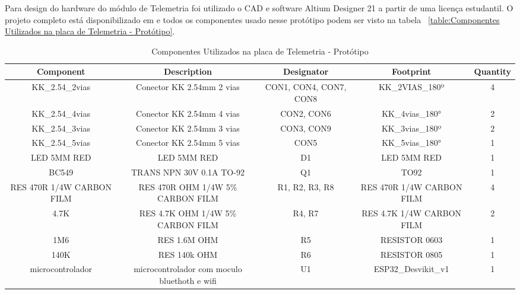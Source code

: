 \documentclass[../delivery_hospital_report.tex]{subfiles}
\begin{document}
Para design do hardware do módulo de Telemetria foi utilizado o CAD e software Altium Designer 21 \cite{altium21} a partir de uma licença estudantil. O projeto completo está disponibilizado em \cite{github_modulos} e todos os componentes usado nesse protótipo podem ser visto na tabela ~\ref{table:Componentes Utilizados na placa de Telemetria - Protótipo}.

\begin{table}[!h]
\caption{Componentes Utilizados na placa de Telemetria - Protótipo}
\centering
\begin{adjustbox}{width=\columnwidth,center}
\begin{tabular}{|c|c|c|c|c|}
\hline
Component                   & Description                                    & Designator               & Footprint                   & Quantity \\ \hline
KK\_2.54\_2vias             & Conector KK 2.54mm 2   vias                    & CON1, CON4, CON7,   CON8 & KK\_2VIAS\_180º             & 4        \\ \hline
KK\_2.54\_4vias             & Conector KK 2.54mm 4   vias                    & CON2, CON6               & KK\_4vias\_180°             & 2        \\ \hline
KK\_2.54\_3vias             & Conector KK 2.54mm 3   vias                    & CON3, CON9               & KK\_3vias\_180º             & 2        \\ \hline
KK\_2.54\_5vias             & Conector KK 2.54mm 5   vias                    & CON5                     & KK\_5vias\_180°             & 1        \\ \hline
LED 5MM RED                 & LED 5MM RED                                    & D1                       & LED 5MM RED                 & 1        \\ \hline
BC549                       & TRANS NPN 30V 0.1A   TO-92                     & Q1                       & TO92                        & 1        \\ \hline
RES 470R 1/4W   CARBON FILM & RES 470R OHM 1/4W 5\%   CARBON FILM            & R1, R2, R3, R8           & RES 470R 1/4W CARBON   FILM & 4        \\ \hline
4.7K                        & RES 4.7K OHM 1/4W 5\%   CARBON FILM            & R4, R7                   & RES 4.7K 1/4W CARBON   FILM & 2        \\ \hline
1M6                         & RES 1.6M OHM                                   & R5                       & RESISTOR 0603               & 1        \\ \hline
140K                        & RES 140k OHM                                   & R6                       & RESISTOR 0805               & 1        \\ \hline
microcontrolador            & microcontrolador com   moculo bluethoth e wifi & U1                       & ESP32\_Desvikit\_v1         & 1        \\ \hline


\end{tabular}
\end{adjustbox}
\end{table}
\end{document}

